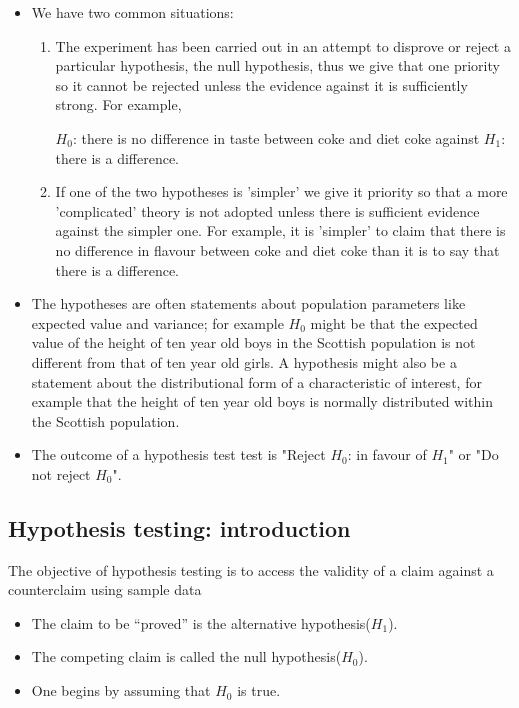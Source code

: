 \documentclass[]{report}
\begin{document}
{\begin{itemize}
\item We have two common situations:
\begin{enumerate}
\item The experiment has been carried out in an attempt to disprove or reject a particular hypothesis, the null hypothesis, thus we give that one priority so it cannot be rejected unless the evidence against it is sufficiently strong. For example,

$H_0$: there is no difference in taste between coke and diet coke
against
$H_1$: there is a difference.

\item If one of the two hypotheses is 'simpler' we give it priority so that a more 'complicated' theory is not adopted unless there is sufficient evidence against the simpler one. For example, it is 'simpler' to claim that there is no difference in flavour between coke and diet coke than it is to say that there is a difference.
\end{enumerate}
\item The hypotheses are often statements about population parameters like expected value and variance; for example $H_0$ might be that the expected value of the height of ten year old boys in the Scottish population is not different from that of ten year old girls. 
A hypothesis might also be a statement about the distributional form of a characteristic of interest, for example that the height of ten year old boys is normally distributed within the Scottish population.
\item 
The outcome of a hypothesis test test is "Reject $H_0$: in favour of $H_1$" or "Do not reject $H_0$".
\end{itemize}







\subsection{Hypothesis testing: introduction}
The objective of hypothesis testing is to access the validity of a claim against a counterclaim using sample data
\begin{itemize}\item The claim to be “proved” is the alternative hypothesis($H_1$).\item The competing claim is called the null hypothesis($H_0$).\item One begins by assuming that $H_0$ is true. \end{itemize}

}
\end{document}
